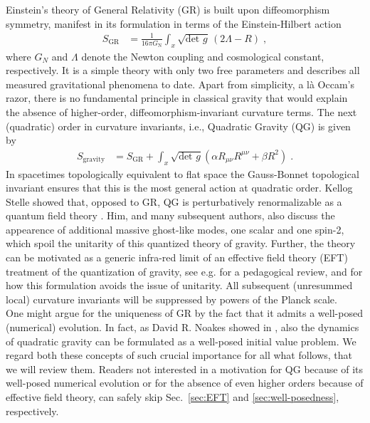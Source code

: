\documentclass[a4paper,oneside,openany,11pt]{memoir}
\numberwithin{equation}{section} %
\begin{document}
Einstein's theory of General Relativity (GR) is built upon diffeomorphism symmetry, manifest in its formulation in terms of the Einstein-Hilbert action
\begin{align}
    S_{\text{GR}} &=
 \frac1{16\pi G_\text{N}}\int_x \sqrt{\text{det } g}\, (2\Lambda-R)\;,
\end{align}
where $G_N$ and $\Lambda$ denote the Newton coupling and cosmological constant, respectively. It is a simple theory with only two free parameters and describes all measured gravitational phenomena to date. Apart from simplicity, a l\`a Occam's razor, there is no fundamental principle in classical gravity that would explain the absence of higher-order, diffeomorphism-invariant curvature terms. The next (quadratic) order in curvature invariants, i.e., Quadratic Gravity (QG) is given by
\begin{align}
    S_{\text{gravity}} &=
 S_\text{GR}
 + \int_x \sqrt{\text{det }g} \left(\alpha  R_{\mu\nu}R^{\mu\nu} + \beta  R^2\right)  \;. 
\end{align}
In spacetimes topologically equivalent to flat space the Gauss-Bonnet topological invariant ensures that this is the most general action at quadratic order. Kellog Stelle showed that, opposed to GR, QG is perturbatively renormalizable as a quantum field theory \cite{Stelle:1976gc}. Him, and many subsequent authors, also discuss the appearence of additional massive ghost-like modes, one scalar and one spin-2, which spoil the unitarity of this quantized theory of gravity. Further, the theory can be motivated as a generic infra-red limit of an effective field theory (EFT) treatment of the quantization of gravity, see e.g. \cite{Donoghue:2012zc} for a pedagogical review, and \cite{} for how this formulation avoids the issue of unitarity. All subsequent (unresummed local) curvature invariants will be suppressed by powers of the Planck scale.
\\
One might argue for the uniqueness of GR by the fact that it admits a well-posed (numerical) evolution. In fact, as David R. Noakes showed in \cite{Noakes:1983}, also the dynamics of quadratic gravity can be formulated as a well-posed initial value problem.
We regard both these concepts of such crucial importance for all what follows, that we will review them. Readers not interested in a motivation for QG because of its well-posed numerical evolution or for the absence of even higher orders because of effective field theory, can safely skip Sec.~\ref{sec:EFT} and \ref{sec:well-posedness}, respectively.
\\
\end{document}

